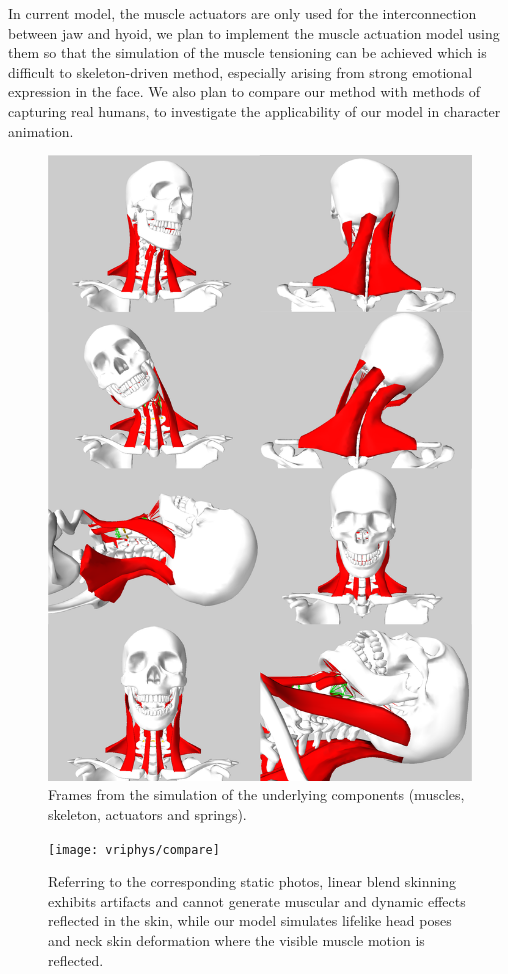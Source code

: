 In current model, the muscle actuators are only used for the interconnection between jaw and hyoid, we plan to implement the muscle actuation model using them so that the simulation of the muscle tensioning can be achieved which is difficult to skeleton-driven method, especially arising from strong emotional expression in the face. We also plan to compare our method with methods of capturing real humans, to investigate the applicability of our model in character animation.
\begin{figure}
\begin{center}
\includegraphics[width=\textwidth]{vriphys/musclesim}
\caption{Frames from the simulation of the underlying components (muscles, skeleton, actuators and springs).}
\label{fig:musclesim}
\end{center}
\end{figure}
\begin{figure}
\begin{center}
\texttt{[image: vriphys/compare]}
\caption{Referring to the corresponding static photos, linear blend skinning exhibits artifacts and cannot generate muscular and dynamic effects reflected in the skin, while our model simulates lifelike
head poses and neck skin deformation where the visible muscle motion is reflected.}
\label{fig:compare}
\end{center}
\end{figure}
